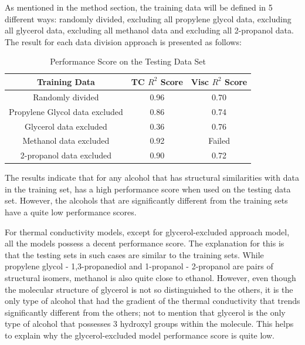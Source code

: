 As mentioned in the method section, the training data will be defined in 5 
different ways: randomly divided, excluding all propylene glycol data, 
excluding all glycerol data, excluding all methanol data and excluding all 
2-propanol data. The result for each data division approach is presented as 
follows:
\begin{table}[ht]
    \centering
    \caption{Performance Score on the Testing Data Set}
    \begin{tabular}{|c|c|c|}
        \hline
        \hline
        Training Data & TC $R^2$ Score & Visc $R^2$ Score\\
        \hline
        Randomly divided & 0.96  & 0.70\\
        Propylene Glycol data excluded & 0.86  & 0.74\\
        Glycerol data excluded & 0.36  & 0.76\\
        Methanol data excluded & 0.92 & Failed\\
        2-propanol data excluded & 0.90  & 0.72\\
        \hline
    \end{tabular}
    \label{table:1}
\end{table}

The results indicate that for any alcohol that has structural similarities 
with data in the training set, has a high performance score when used on 
the testing data set. However, the alcohols that are significantly different 
from the training sets have a quite low performance scores.

For thermal conductivity models, except for glycerol-excluded approach model, 
all the models possess a decent performance score. The explanation for this is 
that the testing sets in such cases are similar to the training sets. While 
propylene glycol - 1,3-propanediol and 1-propanol - 2-propanol are pairs of 
structural isomers, methanol is also quite close to ethanol. However, even 
though the molecular structure of glycerol is not so distinguished to the 
others, it is the only type of alcohol that had the gradient of the thermal 
conductivity that trends significantly different from the others; not to 
mention that glycerol is the only type of alcohol that possesses 3 hydroxyl 
groups within the molecule. This helps to explain why the glycerol-excluded 
model performance score is quite low.

